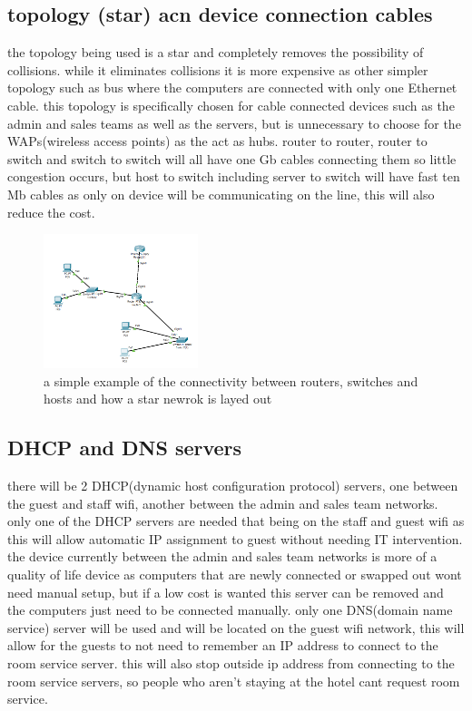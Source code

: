 \documentclass[11pt]{article}
\begin{document}
\subsection{topology (star) acn device connection cables}
the topology being used is a star and completely removes the possibility of collisions. while it eliminates collisions it is more expensive as other simpler topology such as bus  where the computers are connected with only one Ethernet cable. this topology is specifically chosen for cable connected devices such as the admin and sales teams as well as the servers, but is unnecessary to choose for the WAPs(wireless access points) as the act as hubs. router to router, router to switch and switch to switch will all have one Gb cables connecting them so little congestion occurs, but host to switch including server to switch will have fast ten Mb cables as only on device will be communicating on the line, this will also reduce the cost.


\begin{figure}[!hbt]
 	\begin{center}
	  \includegraphics[width=0.4\textwidth]{./simpleExample}
	\end{center}
	\caption{a simple example of the connectivity between routers, switches and hosts and how a star newrok is layed out}
\end{figure}


\subsection{DHCP and DNS servers}
there will be 2 DHCP(dynamic host configuration protocol) servers, one between the guest and staff wifi, another between the admin and sales team networks. only one of the DHCP servers are needed that being on the staff and guest wifi as this will allow automatic IP assignment to guest without needing IT intervention. the device currently between the admin and sales team networks is more of a quality of life device as computers that are newly connected or swapped out wont need manual setup, but if a low cost is wanted this server can be removed and the computers just need to be connected manually. 
only one DNS(domain name service) server will be used and will be located on the guest wifi network, this will allow for the guests to not need to remember an IP address to connect to the room service server. this will also stop outside ip address from connecting to the room service servers, so people who aren't staying at the hotel cant request room service.
\end{document}
